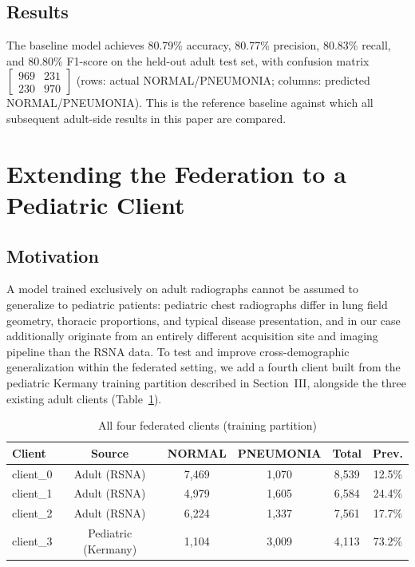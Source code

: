 \documentclass[conference]{IEEEtran}
\begin{document}
\subsection{Results}

The baseline model achieves 80.79\% accuracy, 80.77\% precision, 80.83\%
recall, and 80.80\% F1-score on the held-out adult test set, with confusion
matrix $\begin{bmatrix}969 & 231\\230 & 970\end{bmatrix}$ (rows: actual
NORMAL/PNEUMONIA; columns: predicted NORMAL/PNEUMONIA). This is the
reference baseline against which all subsequent adult-side results in this
paper are compared.

\section{Extending the Federation to a Pediatric Client}
\label{sec:pediatric}

\subsection{Motivation}

A model trained exclusively on adult radiographs cannot be assumed to
generalize to pediatric patients: pediatric chest radiographs differ in lung
field geometry, thoracic proportions, and typical disease presentation, and
in our case additionally originate from an entirely different acquisition
site and imaging pipeline than the RSNA data. To test and improve
cross-demographic generalization within the federated setting, we add a
fourth client built from the pediatric Kermany training partition described
in Section~III, alongside the three existing adult clients
(Table~\ref{tab:all-clients}).

\begin{table}[htbp]
\caption{All four federated clients (training partition)}
\begin{center}
\begin{tabular}{lccccc}
\toprule
\textbf{Client} & \textbf{Source} & \textbf{NORMAL} & \textbf{PNEUMONIA} & \textbf{Total} & \textbf{Prev.} \\
\midrule
client\_0 & Adult (RSNA)     & 7{,}469 & 1{,}070 & 8{,}539 & 12.5\% \\
client\_1 & Adult (RSNA)     & 4{,}979 & 1{,}605 & 6{,}584 & 24.4\% \\
client\_2 & Adult (RSNA)     & 6{,}224 & 1{,}337 & 7{,}561 & 17.7\% \\
client\_3 & Pediatric (Kermany) & 1{,}104 & 3{,}009 & 4{,}113 & 73.2\% \\
\bottomrule
\end{tabular}
\label{tab:all-clients}
\end{center}
\end{table}
\end{document}
